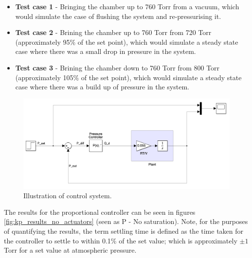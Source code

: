 \begin{itemize}
    \item \textbf{Test case 1} - Bringing the chamber up to 760 Torr from a vacuum, which would simulate the case of flushing the system and re-pressurising it.
    \item \textbf{Test case 2} - Brining the chamber up to 760 Torr from 720 Torr (approximately 95\% of the set point), which would simulate a steady state case where there was a small drop in pressure in the system.
    \item \textbf{Test case 3} - Brining the chamber down to 760 Torr from 800 Torr (approximately 105\% of the set point), which would simulate a steady state case where there was a build up of pressure in the system.
\end{itemize}

\begin{figure}[h!]
	\centering
	\includegraphics[width=\linewidth]{chapter_5/figures/p_controller.png}
	\caption{Illustration of control system.}
	\label{fig:p_controller}
\end{figure}

The results for the proportional controller can be seen in figures \ref{fig:kp_results_no_actuators} (seen as P - No saturation). Note, for the purposes of quantifying the results, the term settling time is defined as the time taken for the controller to settle to within 0.1\% of the set value; which is approximately $\pm1$ Torr for a set value at atmospheric pressure. 

